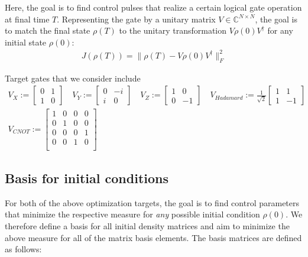\documentclass[letterpaper]{article}
\newcommand{\C}{\mathds{C}}
\begin{document}
Here, the goal is to find control pulses that realize a certain logical gate operation at final time $T$. Representing the gate by a unitary matrix $V\in \C^{N\times N}$, the goal is to match the final state $\rho(T)$ to the unitary transformation $V\rho(0)V^{\dagger}$ for any initial state $\rho(0)$:
\begin{align}
  J(\rho(T)) = \| \rho(T) - V\rho(0)V^{\dagger} \|^2_F 
\end{align} 


Target gates that we consider include
    \begin{align}
      V_{X} := \begin{bmatrix} 0 & 1 \\ 1 & 0  \end{bmatrix} \quad
      V_{Y} := \begin{bmatrix} 0 & -i \\ i & 0 \end{bmatrix} \quad
      V_{Z} := \begin{bmatrix} 1 & 0 \\ 0 & -1 \end{bmatrix} \quad 
      V_{Hadamard} := \frac{1}{\sqrt{2}} \begin{bmatrix} 1 & 1 \\ 1 & -1 \end{bmatrix} \\
      V_{CNOT} := \begin{bmatrix} 1  & 0 & 0 & 0 \\ 
                                   0  & 1 & 0 & 0 \\ 
                                   0  & 0 & 0 & 1 \\ 
                                   0  & 0 & 1 & 0 \\ 
                    \end{bmatrix}
    \end{align}



\subsection{Basis for initial conditions}
For both of the above optimization targets, the goal is to find control parameters that minimize the respective measure for \textit{any} possible initial condition $\rho(0)$. We therefore define a basis for all initial density matrices and aim to minimize the above measure for all of the matrix basis elements. The basis matrices are defined as follows:
\end{document}
